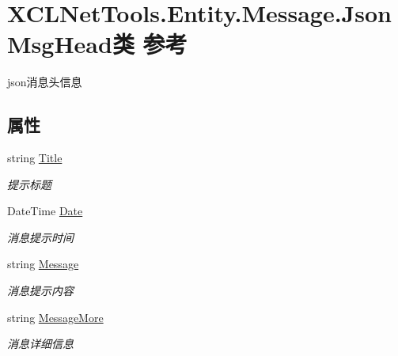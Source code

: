 \hypertarget{class_x_c_l_net_tools_1_1_entity_1_1_message_1_1_json_msg_head}{\section{X\-C\-L\-Net\-Tools.\-Entity.\-Message.\-Json\-Msg\-Head类 参考}
\label{class_x_c_l_net_tools_1_1_entity_1_1_message_1_1_json_msg_head}
}


json消息头信息  


\subsection*{属性}
\begin{DoxyCompactItemize}
\item 
string \hyperlink{class_x_c_l_net_tools_1_1_entity_1_1_message_1_1_json_msg_head_adb0f08c4bef6b6cfe41e6c20eb1e7762}{Title}
\begin{DoxyCompactList}\small\item\em 提示标题 \end{DoxyCompactList}\item 
Date\-Time \hyperlink{class_x_c_l_net_tools_1_1_entity_1_1_message_1_1_json_msg_head_ae57b40b25eb4db28d428134d33358c90}{Date}
\begin{DoxyCompactList}\small\item\em 消息提示时间 \end{DoxyCompactList}\item 
string \hyperlink{class_x_c_l_net_tools_1_1_entity_1_1_message_1_1_json_msg_head_ab27af8e8d3ca0ab58610c3602d869b5b}{Message}
\begin{DoxyCompactList}\small\item\em 消息提示内容 \end{DoxyCompactList}\item 
string \hyperlink{class_x_c_l_net_tools_1_1_entity_1_1_message_1_1_json_msg_head_a5f65bd454c47d349a2a0fae291c73590}{Message\-More}
\begin{DoxyCompactList}\small\item\em 消息详细信息 \end{DoxyCompactList}\item 

\end{DoxyCompactItemize}
